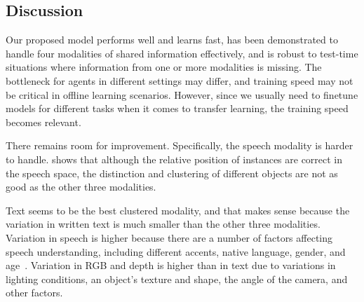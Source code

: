 \documentclass[10pt]{article} %
\begin{document}




\subsection{Discussion}
Our proposed model performs well and learns fast, has been demonstrated to handle four modalities of shared information effectively, and is robust to test-time situations where information from one or more modalities is missing. 
The bottleneck for agents in different settings may differ, and training speed may not be critical in offline learning scenarios. However, since we usually need to finetune models for different tasks when it comes to transfer learning, the training speed becomes relevant.

There remains room for improvement. Specifically, the speech modality is harder to handle.  shows that although the relative position of instances are correct in the speech space, the distinction and clustering of different objects are not as good as the other three modalities.

Text seems to be the best clustered modality, and that makes sense because the variation in written text is much smaller than the other three modalities. Variation in speech is higher because there are a number of factors affecting speech understanding, including different accents, native language, gender, and age~\citep{KebeAAAI2022}. Variation in RGB and depth is higher than in text due to variations in lighting conditions, an object's texture and shape, the angle of the camera, and other factors.
\end{document}
